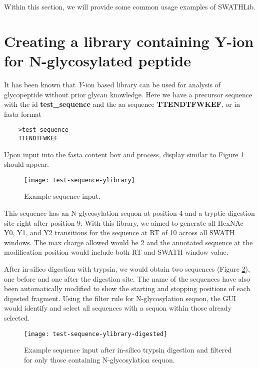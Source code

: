 \documentclass[../manual.tex]{subfiles}
\begin{document}
Within this section, we will provide some common usage examples of SWATHLib.

\section{Creating a library containing Y-ion for N-glycosylated peptide}
It has been known that \emph{Y}-ion based library can be used for analysis of glycopeptide without prior glycan knowledge.\cite{RN474} Here we have a precursor sequence with the id \textbf{test\_sequence} and the aa sequence \textbf{TTENDTFWKEF}, or in fasta format \par
\begin{verbatim}
	>test_sequence
	TTENDTFWKEF
\end{verbatim}

Upon input into the fasta content box and process, display similar to Figure \ref{fig:testsequenceylibrary} should appear.

\begin{figure}[H]
	\centering
	\begin{framed}
        \centering
        \begin{adjustbox}{width=1\textwidth}
			\texttt{[image: test-sequence-ylibrary]}
		\end{adjustbox}
		\caption{Example sequence input.}\label{fig:testsequenceylibrary}
	\end{framed}
\end{figure}


This sequence has an N-glycosylation sequon at position 4 and a tryptic digestion site right after position 9. With this library, we aimed to generate all HexNAc Y0, Y1, and Y2 transitions for the sequence at RT of 10 across all SWATH windows. The max charge allowed would be 2 and the annotated sequence at the modification position would include both RT and SWATH window value.\par


After in-silico digestion with trypsin, we would obtain two sequences (Figure \ref{fig:testsequenceylibrarydigested}), one before and one after the digestion site. The name of the sequences have also been automatically modified to show the starting and stopping positions of each digested fragment. Using the filter rule for N-glycosylation sequon, the GUI would identify and select all sequences with a sequon within those already selected.
\begin{figure}[H]
	\centering
	\begin{framed}
        \centering
        \begin{adjustbox}{width=1\textwidth}
			\texttt{[image: test-sequence-ylibrary-digested]}
		\end{adjustbox}
		\caption{Example sequence input after in-silico trypsin digestion and filtered for only those containing N-glycosylation sequon.}\label{fig:testsequenceylibrarydigested}
	\end{framed}
\end{figure}
\end{document}
